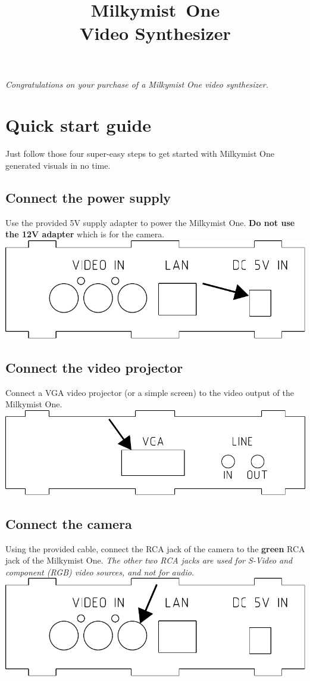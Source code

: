 \documentclass{leaflet}
\title{Milkymist\texttrademark~One\\Video Synthesizer}
\date{}
\begin{document}
\maketitle
\thispagestyle{empty}
\pagestyle{empty} 
\textit{Congratulations on your purchase of a Milkymist One video synthesizer.}

\section{Quick start guide}
Just follow those four super-easy steps to get started with Milkymist One generated visuals in no time.

\subsection{Connect the power supply}
Use the provided 5V supply adapter to power the Milkymist One. \textbf{Do not use the 12V adapter} which is for the camera.
\includegraphics[width=\textwidth]{power.pdf}

\subsection{Connect the video projector}
Connect a VGA video projector (or a simple screen) to the video output of the Milkymist One.
\includegraphics[width=\textwidth]{vga.pdf}

\subsection{Connect the camera}
Using the provided cable, connect the RCA jack of the camera to the \textbf{green} RCA jack of the Milkymist One. \textit{The other two RCA jacks are used for S-Video and component (RGB) video sources, and not for audio.}
\includegraphics[width=\textwidth]{videoin.pdf}
\end{document}

